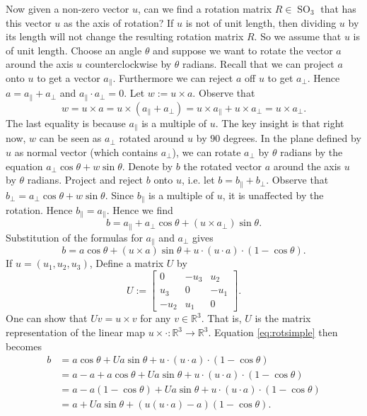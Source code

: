 \documentclass{article}
\DeclareMathOperator{\SO}{SO}
\begin{document}
Now given a non-zero vector $u$, can we find a rotation matrix $R \in \SO_3$ that has this vector $u$ as the axis of rotation? If $u$ is not of unit length, then dividing $u$ by its length will not change the resulting rotation matrix $R$. So we assume that $u$ is of unit length. Choose an angle $\theta$ and suppose we want to rotate the vector $a$ around the axis $u$ counterclockwise by $\theta$ radians. Recall that we can project $a$ onto $u$ to get a vector $a_{\|}$. Furthermore we can reject $a$ off $u$ to get $a_{\perp}$. Hence $a = a_{\|} + a_{\perp}$ and $a_{\|} \cdot a_{\perp} = 0$. Let $w := u \times a$. Observe that
\[ w = u \times a = u \times \left(a_{\|} + a_{\perp}\right) = u \times a_{\|} + u \times a_{\perp} = u \times a_{\perp}. \]
The last equality is because $a_{\|}$ is a multiple of $u$. The key insight is that right now, $w$ can be seen as $a_{\perp}$ rotated around $u$ by $90$ degrees. In the plane defined by $u$ as normal vector (which contains $a_{\perp}$), we can rotate $a_{\perp}$ by $\theta$ radians by the equation $a_{\perp} \cos \theta + w \sin \theta$. Denote by $b$ the rotated vector $a$ around the axis $u$ by $\theta$ radians. Project and reject $b$ onto $u$, i.e. let $b = b_{\|} + b_{\perp}$. Observe that $b_{\perp} = a_{\perp} \cos \theta + w \sin \theta$. Since $b_{\|}$ is a multiple of $u$, it is unaffected by the rotation. Hence $b_{\|} = a_{\|}$. Hence we find
\[ b = a_{\|} + a_{\perp} \cos \theta + (u \times a_{\perp}) \sin \theta. \]
Substitution of the formulas for $a_{\|}$ and $a_{\perp}$ gives
\begin{equation} \label{eq:rotsimple} b = a \cos \theta + (u \times a) \sin \theta + u \cdot (u \cdot a) \cdot (1- \cos \theta). \end{equation}
If $u = (u_1,u_2,u_3)$, Define a matrix $U$ by
\[ U := \begin{bmatrix} 0 & -u_3 & u_2 \\ u_3 & 0 & -u_1 \\ -u_2 & u_1 & 0 \end{bmatrix}. \]
One can show that $Uv = u \times v$ for any $v \in \mathbb{R}^3$. That is, $U$ is the matrix representation of the linear map $u \times \cdot : \mathbb{R}^3 \to \mathbb{R}^3$. Equation \ref{eq:rotsimple} then becomes
\begin{align*} \label{eq:rotmiddle}
b &= a \cos \theta + Ua \sin \theta + u \cdot (u \cdot a) \cdot (1- \cos \theta) \\
&= a - a + a\cos \theta + Ua \sin \theta + u \cdot (u \cdot a) \cdot (1- \cos \theta) \\
&= a - a(1 - \cos \theta) + Ua \sin \theta + u \cdot (u \cdot a) \cdot (1- \cos \theta) \\
&= a  + Ua \sin \theta +\left(u(u \cdot a) - a\right) (1- \cos \theta).
\end{align*}
\end{document}
